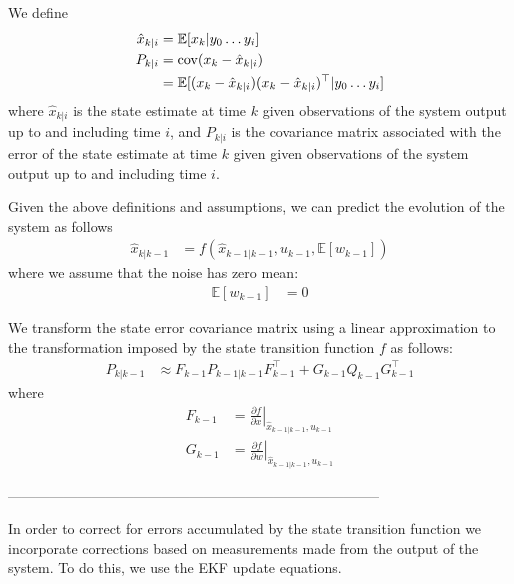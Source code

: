 \documentclass[]{article}
\begin{document}
{We define
\begin{align}
	\hat{x}_{k|i} 	&= \mathbb{E}[x_k|y_0 \hdots y_i] \\
	P_{k|i} 		&= \operatorname{cov}(x_k - \hat{x}_{k|i}) \notag \\
					&= \mathbb{E}[ (x_k-\hat{x}_{k|i}) (x_k-\hat{x}_{k|i})^\top | y_0 \hdots y_i]
\end{align}
where $\hat{x}_{k|i}$ is the state estimate at time $k$ given observations of the system output up to and including time $i$, and $P_{k|i}$ is the covariance matrix associated with the error of the state estimate at time $k$ given given observations of the system output up to and including time $i$.

Given the above definitions and assumptions, we can predict the evolution of the system as follows
\begin{align}
	\hat{x}_{k|k-1} &= f(\hat{x}_{k-1|k-1}, u_{k-1}, \mathbb{E}[w_{k-1}])
	\label{eqn:predictx}
\end{align}
where we assume that the noise has zero mean:
\begin{align}
	\mathbb{E}[w_{k-1}] &= 0
\end{align}

We transform the state error covariance matrix using a linear approximation to the transformation imposed by the state transition function $f$ as follows:
\begin{align}
	P_{k|k-1} &\approx F_{k-1} P_{k-1|k-1} F_{k-1}^\top + G_{k-1} Q_{k-1} G_{k-1}^\top
	\label{eqn:predictP}
\end{align}
where
\begin{align}
	F_{k-1} &= \left . \frac{\partial f}{\partial x} \right \vert _{\hat{x}_{k-1|k-1},u_{k-1}} \\
	G_{k-1} &= \left . \frac{\partial f}{\partial w} \right \vert _{\hat{x}_{k-1|k-1},u_{k-1}}
\end{align}

--------------------------------------------------------------------------------

In order to correct for errors accumulated by the state transition function we incorporate corrections based on measurements made from the output of the system. To do this, we use the EKF update equations.

}
\end{document}

